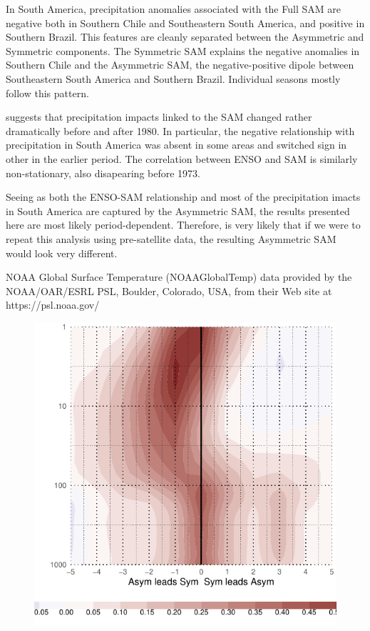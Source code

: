 \documentclass[twocol]{ametsocV5}
\begin{document}
In South America, precipitation anomalies associated with the Full SAM
are negative both in Southern Chile and Southeastern South America, and
positive in Southern Brazil. This features are cleanly separated between
the Asymmetric and Symmetric components. The Symmetric SAM explains the
negative anomalies in Southern Chile and the Asymmetric SAM, the
negative-positive dipole between Southeastern South America and Southern
Brazil. Individual seasons mostly follow this pattern.

\citet{silvestri2009} suggests that precipitation impacts linked to the
SAM changed rather dramatically before and after 1980. In particular,
the negative relationship with precipitation in South America was absent
in some areas and switched sign in other in the earlier period. The
correlation between ENSO and SAM is similarly non-stationary, also
disapearing before 1973.

Seeing as both the ENSO-SAM relationship and most of the precipitation
imacts in South America are captured by the Asymmetric SAM, the results
presented here are most likely period-dependent. Therefore, is very
likely that if we were to repeat this analysis using pre-satellite data,
the resulting Asymmetric SAM would look very different.

\acknowledgments

NOAA Global Surface Temperature (NOAAGlobalTemp) data provided by the
NOAA/OAR/ESRL PSL, Boulder, Colorado, USA, from their Web site at
https://psl.noaa.gov/



\newpage

\appendix


\begin{figure}
\includegraphics{A1-1} \label{fig:A1}
\end{figure}
\end{document}
